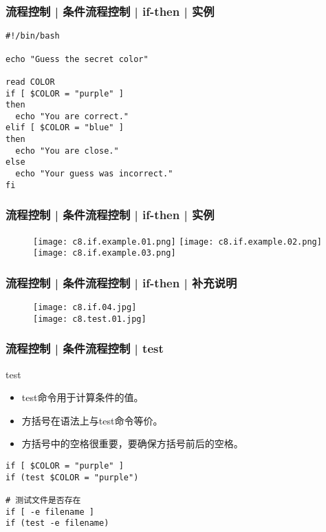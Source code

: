 \begin{frame}[fragile]
  \frametitle{流程控制 | 条件流程控制 | if-then | 实例}
\begin{lstlisting}
#!/bin/bash

echo "Guess the secret color"

read COLOR
if [ $COLOR = "purple" ]
then
  echo "You are correct."
elif [ $COLOR = "blue" ]
then
  echo "You are close."
else
  echo "Your guess was incorrect."
fi
\end{lstlisting}
\end{frame}

\begin{frame}
  \frametitle{流程控制 | 条件流程控制 | if-then | \alert{实例}}
  \begin{figure}
    \texttt{[image: c8.if.example.01.png]}\quad
    \texttt{[image: c8.if.example.02.png]}\\
    \texttt{[image: c8.if.example.03.png]}
  \end{figure}
\end{frame}

\begin{frame}
  \frametitle{流程控制 | 条件流程控制 | if-then | 补充说明}
  \begin{figure}
    \centering
    \texttt{[image: c8.if.04.jpg]}\\
    \texttt{[image: c8.test.01.jpg]}
  \end{figure}
\end{frame}

\begin{frame}[fragile]
  \frametitle{流程控制 | 条件流程控制 | \alert{test}}
  \begin{block}{test}
    \begin{itemize}
      \item test命令用于计算条件的值。
      \item 方括号在语法上与test命令等价。
      \item 方括号中的空格很重要，要确保方括号前后的空格。
    \end{itemize}
  \end{block}
  \pause
\begin{lstlisting}
if [ $COLOR = "purple" ]
if (test $COLOR = "purple")

# 测试文件是否存在
if [ -e filename ]
if (test -e filename)
\end{lstlisting}
\end{frame}

